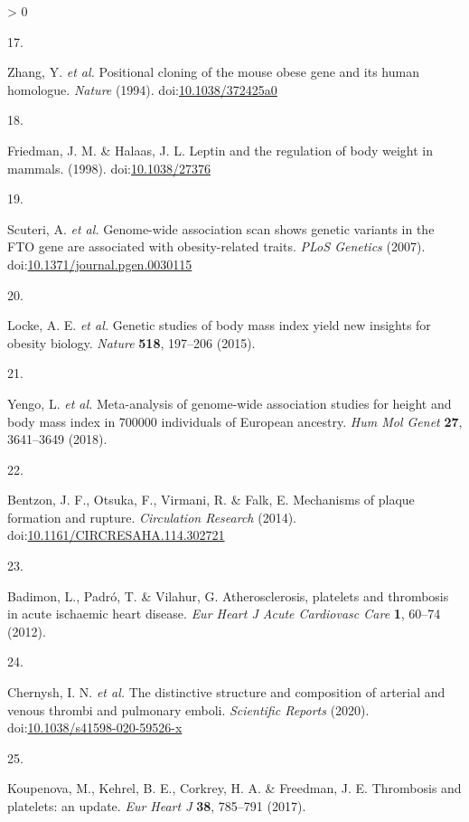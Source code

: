 \documentclass[11pt,twoside]{bristolthesis}
\newlength{\cslhangindent}
\newlength{\csllabelwidth}
\newenvironment{CSLReferences}[2] %
 {%
  \setlength{\parindent}{0pt}
  \ifodd #1 \everypar{\setlength{\hangindent}{\cslhangindent}}\ignorespaces\fi
  \ifnum #2 > 0
  \setlength{\parskip}{#2\baselineskip}
  \fi
 }%
 {}
\newcommand{\CSLLeftMargin}[1]{\parbox[t]{\csllabelwidth}{#1}}
\newcommand{\CSLRightInline}[1]{\parbox[t]{\linewidth - \csllabelwidth}{#1}\break}
\begin{document}
\begin{CSLReferences}{0}{0}
\leavevmode\hypertarget{ref-Zhang1994}{}%
\CSLLeftMargin{17. }
\CSLRightInline{Zhang, Y. \emph{et al.} {Positional cloning of the mouse obese gene and its human homologue}. \emph{Nature} (1994). doi:\href{https://doi.org/10.1038/372425a0}{10.1038/372425a0}}

\leavevmode\hypertarget{ref-Friedman1998}{}%
\CSLLeftMargin{18. }
\CSLRightInline{Friedman, J. M. \& Halaas, J. L. {Leptin and the regulation of body weight in mammals}. (1998). doi:\href{https://doi.org/10.1038/27376}{10.1038/27376}}

\leavevmode\hypertarget{ref-Scuteri2007}{}%
\CSLLeftMargin{19. }
\CSLRightInline{Scuteri, A. \emph{et al.} {Genome-wide association scan shows genetic variants in the FTO gene are associated with obesity-related traits}. \emph{PLoS Genetics} (2007). doi:\href{https://doi.org/10.1371/journal.pgen.0030115}{10.1371/journal.pgen.0030115}}

\leavevmode\hypertarget{ref-Locke2015}{}%
\CSLLeftMargin{20. }
\CSLRightInline{Locke, A. E. \emph{et al.} {Genetic studies of body mass index yield new insights for obesity biology}. \emph{Nature} \textbf{518}, 197--206 (2015).}

\leavevmode\hypertarget{ref-Yengo2018}{}%
\CSLLeftMargin{21. }
\CSLRightInline{Yengo, L. \emph{et al.} {Meta-analysis of genome-wide association studies for height and body mass index in 700000 individuals of European ancestry}. \emph{Hum Mol Genet} \textbf{27}, 3641--3649 (2018).}

\leavevmode\hypertarget{ref-Bentzon2014}{}%
\CSLLeftMargin{22. }
\CSLRightInline{Bentzon, J. F., Otsuka, F., Virmani, R. \& Falk, E. {Mechanisms of plaque formation and rupture}. \emph{Circulation Research} (2014). doi:\href{https://doi.org/10.1161/CIRCRESAHA.114.302721}{10.1161/CIRCRESAHA.114.302721}}

\leavevmode\hypertarget{ref-Badimon2012}{}%
\CSLLeftMargin{23. }
\CSLRightInline{Badimon, L., Padró, T. \& Vilahur, G. {Atherosclerosis, platelets and thrombosis in acute ischaemic heart disease}. \emph{Eur Heart J Acute Cardiovasc Care} \textbf{1}, 60--74 (2012).}

\leavevmode\hypertarget{ref-Chernysh2020}{}%
\CSLLeftMargin{24. }
\CSLRightInline{Chernysh, I. N. \emph{et al.} {The distinctive structure and composition of arterial and venous thrombi and pulmonary emboli}. \emph{Scientific Reports} (2020). doi:\href{https://doi.org/10.1038/s41598-020-59526-x}{10.1038/s41598-020-59526-x}}

\leavevmode\hypertarget{ref-Koupenova2017a}{}%
\CSLLeftMargin{25. }
\CSLRightInline{Koupenova, M., Kehrel, B. E., Corkrey, H. A. \& Freedman, J. E. {Thrombosis and platelets: an update}. \emph{Eur Heart J} \textbf{38}, 785--791 (2017).}


\end{CSLReferences}
\end{document}
